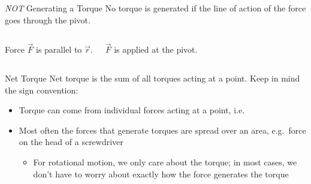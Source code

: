 \documentclass[12pt,compress,aspectratio=169]{beamer}
\begin{document}
\begin{frame}{\emph{NOT} Generating a Torque}
  No torque is generated if the line of action of the force goes through the
  pivot.
  \begin{columns}[T]
    \centering
    \vspace{.45in}

    \vspace{.03in}
    {\footnotesize Force $\vec F$ is parallel to $\vec r$.\par}

    \centering

    {\footnotesize $\vec F$ is applied at the pivot.\par}
  \end{columns}
\end{frame}



\begin{frame}{Net Torque}
  Net torque is the sum of all torques acting at a point. Keep in mind the sign
  convention:

  \begin{itemize}
  \item Torque can come from individual forces acting at a point, i.e.


  \item\vspace{-.15in} Most often the forces that generate torques are spread
    over an area, e.g.\ force on the head of a screwdriver
    \begin{itemize}
    \item For rotational motion, we only care about the torque; in most cases,
      we don't have to worry about exactly how the force generates the torque
    \end{itemize}
  \end{itemize}
\end{frame}
\end{document}
